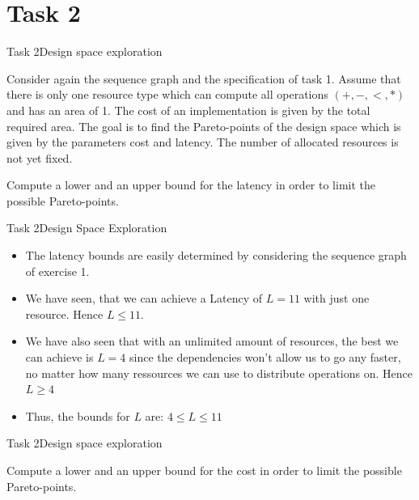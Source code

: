 
\section{Task 2}

\setcounter{task}{1}
\begin{frame}{Task 2}{Design space exploration}
    \begin{tasknoinc}
        Consider again the sequence graph and the speciﬁcation of task 1. Assume that there is only one resource type which can compute all operations $(+, -, <, *)$ and has an area of 1. The cost of an implementation is given by the total required area. The goal is to ﬁnd the Pareto-points of the design space which is given by the parameters cost and latency. The number of allocated resources is not yet ﬁxed.
        \bigskip

        Compute a lower and an upper bound for the latency in order to limit the possible Pareto-points.
    \end{tasknoinc}
\end{frame}
\begin{frame}{Task 2}{Design Space Exploration}
    \begin{solution}
        \begin{itemize}
            \item The latency bounds are easily determined by considering the sequence graph of exercise 1.
            \item We have seen, that we can achieve a Latency of $L = 11$ with just one resource. Hence $L \leq 11$.
            \item We have also seen that with an unlimited amount of resources, the best we can achieve is $L = 4$ since the dependencies won't allow us to go any faster, no matter how many ressources we can use to distribute operations on. Hence $L \geq 4$
            \item Thus, the bounds for $L$ are: $4 \leq L \leq 11$
        \end{itemize}
    \end{solution}
\end{frame}
\begin{frame}{Task 2}{Design space exploration}
    \begin{tasknoinc}
        Compute a lower and an upper bound for the cost in order to limit the possible Pareto-points.
    \end{tasknoinc}
\end{frame}

